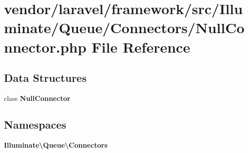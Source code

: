\section{vendor/laravel/framework/src/\+Illuminate/\+Queue/\+Connectors/\+Null\+Connector.php File Reference}
\label{_null_connector_8php}
\subsection*{Data Structures}
\begin{DoxyCompactItemize}
\item 
class {\bf Null\+Connector}
\end{DoxyCompactItemize}
\subsection*{Namespaces}
\begin{DoxyCompactItemize}
\item 
 {\bf Illuminate\textbackslash{}\+Queue\textbackslash{}\+Connectors}
\end{DoxyCompactItemize}
